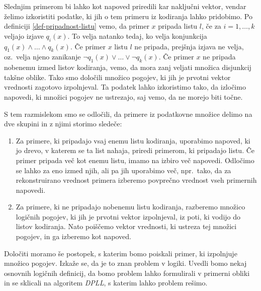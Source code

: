 \documentclass[12pt,a4paper]{article}
\begin{document}
Slednjim primerom bi lahko kot napoved priredili kar naključni vektor, vendar želimo izkoristiti podatke, ki jih o tem primeru iz kodiranja lahko pridobimo.
Po definiciji \ref{def-pripadnost-listu} vemo, da primer $x$ pripada listu $l$, če za $i=1,\ldots,k$ veljajo izjave $q_i(x)$. 
To velja natanko tedaj, ko velja konjunkcija $q_1(x)\land \ldots \land q_k(x)$. 
Če primer $x$ listu $l$ ne pripada, prejšnja izjava ne velja, oz.~velja njeno zanikanje $\lnot q_1(x) \lor \ldots \lor \lnot q_k(x)$.
Če primer $x$ ne pripada nobenemu izmed listov kodiranja, vemo, da mora zanj veljati množica disjunkcij takšne oblike.
Tako smo določili množico pogojev, ki jih je prvotni vektor vrednosti zagotovo izpolnjeval.
Ta podatek lahko izkoristimo tako, da izločimo napovedi, ki množici pogojev ne ustrezajo, saj vemo, da ne morejo biti točne.

S tem razmislekom smo se odločili, da primere iz podatkovne množice delimo na dve skupini in z njimi storimo sledeče:
\begin{enumerate}
	\item Za primere, ki pripadajo vsaj enemu listu kodiranja, 
	uporabimo napoved, ki jo drevo, v katerem se ta list nahaja, priredi primerom, ki pripadajo listu.
	Če primer pripada več kot enemu listu, imamo na izbiro več napovedi.
	Odločimo se lahko za eno izmed njih, ali pa jih uporabimo več, npr.\ 
	tako, da za rekonstruirano vrednost primera izberemo povprečno vrednost vseh primernih napovedi.

	\item Za primere, ki ne pripadajo nobenemu listu kodiranja, 
	razberemo množico logičnih pogojev, ki jih je prvotni vektor izpolnjeval, iz poti, ki vodijo do listov kodiranja.
	Nato poiščemo vektor vrednosti, ki ustreza tej množici pogojev, in ga izberemo kot napoved.
\end{enumerate}

Določiti moramo še postopek, s katerim bomo poiskali primer, ki izpolnjuje množico pogojev.
Izkaže se, da je to znan problem v logiki. Uvedli bomo nekaj osnovnih logičnih definicij, 
da bomo problem lahko formulirali v primerni obliki in se sklicali na algoritem \emph{DPLL}, s katerim lahko problem rešimo.

\end{document}
